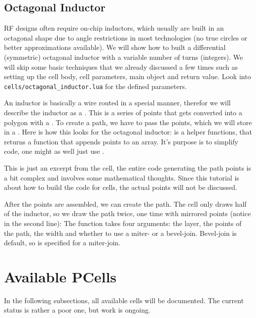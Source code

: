 \subsection{Octagonal Inductor}
RF designs often require on-chip inductors, which usually are built in an octagonal shape due to angle restrictions in most technologies (no true circles or better
approximations available). We will show how to built a differential (symmetric) octagonal inductor with a variable number of turns (integers). We will skip some
basic techniques that we already discussed a few times such as setting up the cell body, cell parameters, main object and return value. Look into
\texttt{cells/octagonal\_inductor.lua} for the defined parameters.

An inductor is basically a wire routed in a special manner, therefor we will describe the inductor as a . This is a series of points that gets
converted into a polygon with a . To create a path, we have to pass the points, which we will store in a . Here is how this looks
for the octagonal inductor: 
 is a helper functions, that returns a function that appends points to an array. It's purpose is to simplify code, one might as well
just use .

This is just an excerpt from the cell, the entire code generating the path points is a bit complex and involves some mathematical thoughts. Since this tutorial is
about how to build the code for cells, the actual points will not be discussed.

After the points are assembled, we can create the path. The cell only draws half of the inductor, so we draw the path twice, one time with mirrored points (notice
 in the second line):
The  function takes four arguments: the layer, the points of the path, the width and whether to use a miter- or a bevel-join. Bevel-join is
default, so  is specified for a miter-join.

\section{Available PCells}
In the following subsections, all available cells will be documented. The current status is rather a poor one, but work is ongoing.
